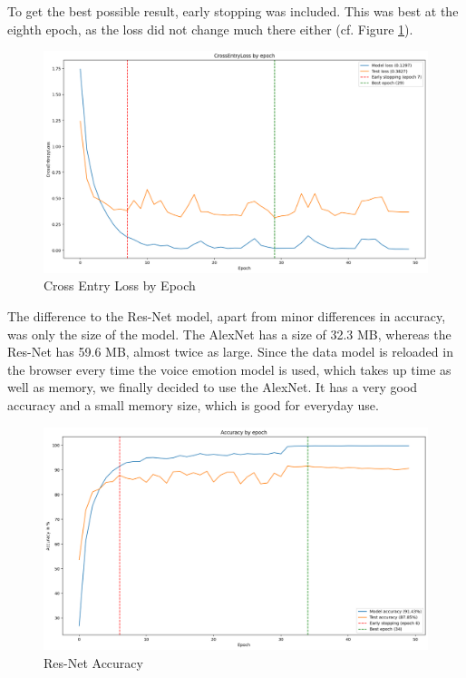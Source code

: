 To get the best possible result, early stopping was included. This was best at the eighth epoch, as the loss did not change much there either (cf. Figure \ref{fig:CrossEntryLoss by Epoch}).
\newpage
\begin{figure}[h]
\centering
\includegraphics[width=1\textwidth]{assets/alexnet_loss.png}
\caption{Cross Entry Loss by Epoch}
\label{fig:CrossEntryLoss by Epoch}
\end{figure}

The difference to the Res-Net model, apart from minor differences in accuracy, was only the size of the model. The AlexNet has a size of 32.3 MB, whereas the Res-Net has 59.6 MB, almost twice as large. Since the data model is reloaded in the browser every time the voice emotion model is used, which takes up time as well as memory, we finally decided to use the AlexNet. It has a very good accuracy and a small memory size, which is good for everyday use.

\begin{figure}[h]
\centering
\includegraphics[width=1\textwidth]{assets/resnet_accuracy.png}
\caption{Res-Net Accuracy}
\label{fig:resnet_accuracy}
\end{figure}

